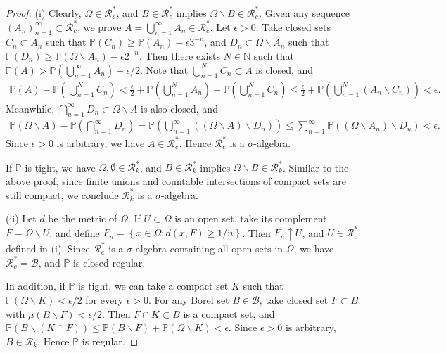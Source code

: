 \documentclass{article}
\numberwithin{equation}{section}
\renewcommand{\P}{\mathbb{P}}
\theoremstyle{plain}
\theoremstyle{definition}
\begin{document}
\begin{proof}
(i) Clearly, $\Omega\in\mathscr{R}_c^*$, and $B\in\mathscr{R}_c^*$ implies $\Omega\backslash B\in\mathscr{R}_c^*$. Given any sequence $(A_n)_{n=1}^\infty\subset\mathscr{R}_c^*$, we prove $A=\bigcup_{n=1}^\infty A_n\in\mathscr{R}_c^*$. Let $\epsilon>0$. Take closed sets $C_n\subset A_n$ such that $\P(C_n)\geq\P(A_n)-\epsilon 3^{-n}$, and $D_n\subset\Omega\backslash A_n$ such that $\P(D_n)\geq\P(\Omega\backslash A_n)-\epsilon 2^{-n}$. Then there exists $N\in\mathbb{N}$ such that $\P(A)>\P\left(\bigcup_{n=1}^\infty A_n\right)-\epsilon/2$. Note that $\bigcup_{n=1}^N C_n\subset A$ is closed, and
\begin{align*}
	\P(A)-\P\left(\bigcup_{n=1}^N C_n\right)<\frac{\epsilon}{2}+\P\left(\bigcup_{n=1}^N A_n\right)-\P\left(\bigcup_{n=1}^N C_n\right)\leq\frac{\epsilon}{2}+\P\left(\bigcup_{n=1}^N(A_n\backslash C_n)\right)<\epsilon.
\end{align*}
Meanwhile, $\bigcap_{n=1}^\infty D_n\subset\Omega\backslash A$ is also closed, and
\begin{align*}
	\P\left(\Omega\backslash A\right)-\P\left(\bigcap_{n=1}^\infty D_n\right)=\P\left(\bigcup_{n=1}^\infty\left((\Omega\backslash A)\backslash D_n\right)\right)\leq\sum_{n=1}^\infty\P\left((\Omega\backslash A_n)\backslash D_n\right) < \epsilon.
\end{align*}
Since $\epsilon>0$ is arbitrary, we have $A\in\mathscr{R}_c^*$. Hence $\mathscr{R}_c^*$ is a $\sigma$-algebra.

If $\P$ is tight, we have $\Omega,\emptyset\in\mathscr{R}_k^*$, and $B\in\mathscr{R}_k^*$ implies $\Omega\backslash B\in\mathscr{R}_k^*$. Similar to the above proof, since finite unions and countable intersections of compact sets are still compact, we conclude $\mathscr{R}_k^*$ is a $\sigma$-algebra. \vspace{0.1cm}

(ii) Let $d$ be the metric of $\Omega$. If $U\subset\Omega$ is an open set, take its complement $F=\Omega\backslash U$, and define $F_n=\left\{x\in\Omega:d(x,F)\geq 1/n\right\}$. Then $F_n\uparrow U$, and $U\in\mathscr{R}_c^*$ defined in (i). Since $\mathscr{R}_c^*$ is a $\sigma$-algebra containing all open sets in $\Omega$, we have $\mathscr{R}_c^*=\mathscr{B}$, and $\P$ is closed regular.

In addition, if $\P$ is tight, we can take a compact set $K$ such that $\P(\Omega\backslash K)<\epsilon/2$ for every $\epsilon>0$. For any Borel set $B\in\mathscr{B}$, take closed set $F\subset B$ with $\mu(B\backslash F)<\epsilon/2$. Then $F\cap K\subset B$ is a compact set, and $\P(B\backslash(K\cap F))\leq\P(B\backslash F)+\P(\Omega\backslash K)<\epsilon$. Since $\epsilon>0$ is arbitrary, $B\in\mathscr{R}_k$. Hence $\P$ is regular.\vspace{0.1cm}


\end{proof}
\end{document}
